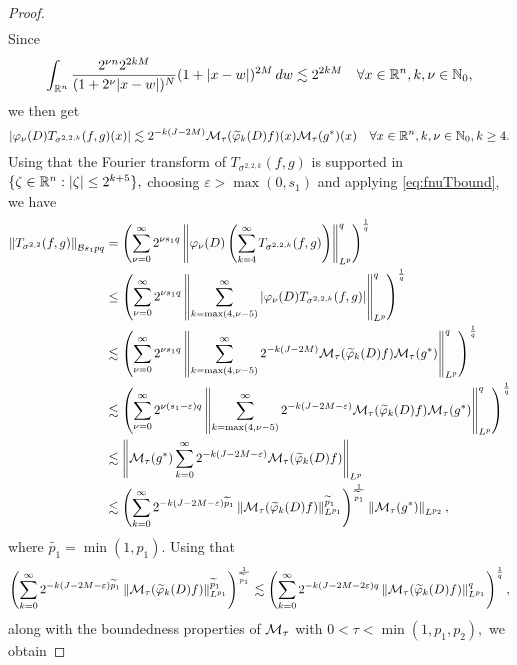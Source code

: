 \begin{proof}
\begin{align*}
\end{align*}
Since
\begin{align*}
\int_{{{\mathbb R}^n}}  \frac{2^{\nu n} 2^{2kM}}{(1+ 2^\nu |x- w|)^N}(1 +  |x-w|)^{2M} \, dw\lesssim 2^{2kM}\quad \forall x\in{{\mathbb R}^n}, k,\nu\in\mathbb{N}_0,
\end{align*}
we then get 
\begin{equation}\label{eq:fnuTbound}
|\varphi_\nu(D) T_{\sigma^{2,2,k}}(f,g)(x)|\lesssim  2^{-k (J-2M)} \mathcal{M}_\tau(\widetilde{\varphi}_k(D)f)(x) \mathcal{M}_\tau(g^*)(x)\quad \forall x\in{{\mathbb R}^n}, k,\nu\in\mathbb{N}_0, k\ge 4.
\end{equation}
 Using that  the Fourier transform of  $T_{\sigma^{2,2,k}}(f,g)$ is supported in $\{\zeta \in {{\mathbb R}^n}: |\zeta| \leq 2^{k+5} \},$ choosing $\varepsilon>\max(0,s_1)$ and applying   \eqref{eq:fnuTbound},  we have
\begin{align*}
 \left\|T_{\sigma^{2,2}}(f,g)\right\|_{\mathcal{B}{s_1}{p}{q}} &=  \left(\sum\limits_{\nu =0}^\infty 2^{\nu s_1q}\left\|\varphi_\nu(D) \left(\sum\limits_{k=4}^\infty T_{\sigma^{2,2,k}}(f,g)\right)\right\|_{L^p}^q \right)^\frac{1}{q}\\
&\le \left(\sum\limits_{\nu =0}^{\infty}  2^{\nu  s_1 q} \left\|\sum\limits_{k=\max(4,\nu -5)}^\infty \left| \varphi_\nu(D) T_{\sigma^{2,2,k}}(f,g)\right|\right\|_{L^p}^q \right)^\frac{1}{q}\\
& \lesssim \left(\sum\limits_{\nu =0}^{\infty}  2^{\nu  s_1q} \left\|\sum\limits_{k=\max(4,\nu -5)}^\infty 2^{-k (J-2M)}  \mathcal{M}_\tau(\widetilde{\varphi}_k(D)f) \mathcal{M}_\tau(g^*)\right\|_{L^p}^q \right)^\frac{1}{q}\\
& \lesssim \left(\sum\limits_{\nu =0}^{\infty}  2^{\nu  (s_1-\varepsilon) q} \left\|\sum\limits_{k=\max(4,\nu -5)}^\infty 2^{-k (J-2M-\varepsilon)}  \mathcal{M}_\tau(\widetilde{\varphi}_k(D)f) \mathcal{M}_\tau(g^*)\right\|_{L^p}^q \right)^\frac{1}{q}\\
&\lesssim\left\| \mathcal{M}_\tau(g^*) \sum\limits_{k=0}^\infty 2^{-k (J-2M-\varepsilon)}  \mathcal{M}_\tau(\widetilde{\varphi}_k(D)f) \right\|_{L^p}\\
&\lesssim \left(\sum\limits_{k=0}^\infty 2^{-k (J-2M-\varepsilon)\widetilde{p}_1} \left\|\mathcal{M}_\tau(\widetilde{\varphi}_k(D)f)\right\|_{L^{p_1}}^{\widetilde{p}_1} \right)^{\frac{1}{\widetilde{p}_1}}\left\|\mathcal{M}_\tau(g^*)\right\|_{L^{p_2}},
\end{align*}
where $\widetilde{p_1}=\min(1,p_1).$ Using that
$$
\left(\sum\limits_{k=0}^\infty 2^{-k (J-2M-\varepsilon)\widetilde{p}_1} \left\|\mathcal{M}_\tau(\widetilde{\varphi}_k(D)f)\right\|_{L^{p_1}}^{\widetilde{p}_1} \right)^{\frac{1}{\widetilde{p}_1}}\lesssim \left( \sum\limits_{k=0}^\infty 2^{-k  (J-2M -2\varepsilon)q} \left\|\mathcal{M}_\tau(\widetilde{\varphi}_k(D)f)\right\|_{L^{p_1}}^q  \right)^\frac{1}{q},
$$
along with  the boundedness properties of $\mathcal{M}_\tau$ with $0<\tau<\min(1,p_1,p_2),$ we obtain

\end{proof}
